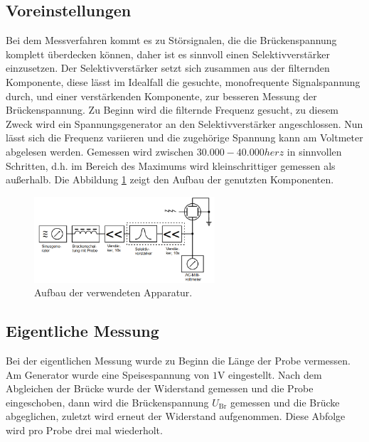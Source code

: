 \subsection{Voreinstellungen}
Bei dem Messverfahren kommt es zu Störsignalen, die  die Brückenspannung komplett überdecken können, daher ist es sinnvoll
einen Selektivverstärker einzusetzen. Der Selektivverstärker setzt sich zusammen aus der filternden Komponente, diese
lässt im Idealfall die gesuchte, monofrequente Signalspannung durch, und einer verstärkenden Komponente, zur besseren Messung
der Brückenspannung. Zu Beginn wird die filternde Frequenz gesucht, zu diesem Zweck wird ein Spannungsgenerator an den Selektivverstärker
angeschlossen. Nun lässt sich die Frequenz variieren und die zugehörige Spannung kann am Voltmeter abgelesen werden.
Gemessen wird zwischen $30.000-40.000 \si{herz}$ in sinnvollen Schritten, d.h. im Bereich des Maximums wird kleinschrittiger gemessen
als außerhalb. Die Abbildung \ref{fig:sv} zeigt den Aufbau der genutzten Komponenten.
\begin{figure}
  \centering
  \includegraphics[width=0.6\textwidth]{Selektiv.PNG}
  \caption{Aufbau der verwendeten Apparatur.\cite{sample}}
  \label{fig:sv}
\end{figure}


\subsection{Eigentliche Messung}
\label{sec:test}
Bei der eigentlichen Messung wurde zu Beginn die Länge der Probe vermessen.
Am Generator wurde eine Speisespannung von $1\si{\volt}$ eingestellt.
Nach dem Abgleichen der Brücke wurde der Widerstand gemessen und die Probe eingeschoben, dann wird die Brückenspannung $U_\mathrm{Br}$
gemessen und die Brücke abgeglichen, zuletzt wird erneut der Widerstand aufgenommen. Diese Abfolge wird pro Probe drei mal wiederholt.
